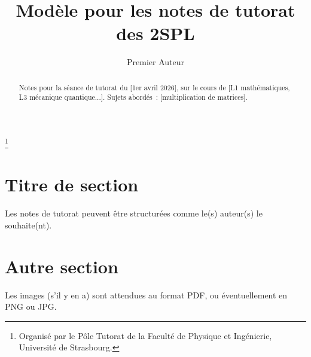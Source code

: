 \documentclass[
 reprint,
 preprintnumbers,
 nobibnotes,
 nofootinbib,
 longbibliography,
 amsmath,amssymb,
 aps,prl,
 onecolumn
]{revtex4-2}
\renewcommand{\journalname}{Strasbourg Students Physical Letters}
\renewcommand{\volumename}{X}
\renewcommand{\numbername}{03xx}
\newcommand{\header}{{\footnotesize\today} \hspace{8em} {\sc\journalname} \; {\bf\volumename},\; \numbername \; \hspace{9em} {\footnotesize CC BY-SA 4.0}}
\begin{document}
\preprint{\header}%



\title{Modèle pour les notes de tutorat des 2SPL}
\thanks{Organisé par le Pôle Tutorat de la Faculté de Physique et Ingénierie, Université de Strasbourg.}

\author{Premier Auteur}


\begin{abstract}
    Notes pour la séance de tutorat du [1er avril 2026], sur le cours de [L1 mathématiques, L3 mécanique quantique...]. Sujets abordés~: [multiplication de matrices].
\end{abstract}

\maketitle



\section{Titre de section}

Les notes de tutorat peuvent être structurées comme le(s) auteur(s) le souhaite(nt).

\section{Autre section}

Les images (s'il y en a) sont attendues au format PDF, ou éventuellement en PNG ou JPG.

\end{document}
